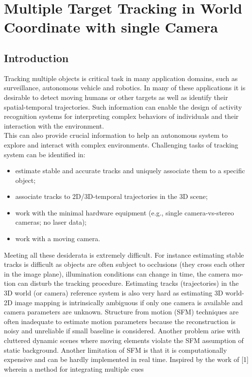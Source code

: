\chapter*{Multiple Target Tracking in World Coordinate with single Camera}
\section{Introduction}
Tracking multiple objects is critical task in many application domains, such as surveillance, autonomous vehicle and robotics. In many of these applications it is desirable to detect moving humans or other targets as well as identify their spatial-temporal trajectories. Such information can enable the design of activity recognition systems for interpreting complex behaviors of individuals and their interaction with the environment.\\ 
This can also provide crucial information to help an autonomous system to explore and interact with complex environments.
Challenging tasks of tracking system can be identified in:
\begin{itemize}
\item estimate stable and accurate tracks and uniquely associate them to a specific object; \item associate tracks to 2D/3D-temporal trajectories in the 3D scene; 
\item work with the minimal hardware equipment (e.g., single
camera-vs-stereo cameras; no laser data); 
\item work with a moving camera. 
\end{itemize}
Meeting all these desiderata is extremely difficult. For instance estimating stable
tracks is difficult as objects are often subject to occlusions (they cross each other
in the image plane), illumination conditions can change in time, the camera mo-
tion can disturb the tracking procedure. Estimating tracks (trajectories) in the
3D world (or camera) reference system is also very hard as estimating 3D world-2D image mapping is intrinsically ambiguous if only one camera is available and
camera parameters are unknown. Structure from motion (SFM) techniques are
often inadequate to estimate motion parameters because the reconstruction is
noisy and unreliable if small baseline is considered. Another problem arise with cluttered dynamic scenes where moving elements violate the SFM assumption of static background.
Another limitation of SFM is that it is computationally expensive and can be hardly implemented in real time.
Inspired by the work of [1] wherein a method for integrating multiple cues
